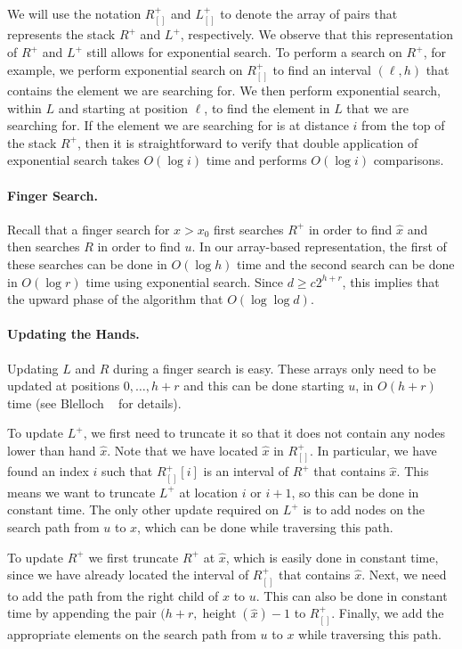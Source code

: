 \documentclass{patmorin}
\DeclareMathOperator{\hgt}{height}
\begin{document}
We will use the notation $R^+_{[]}$ and $L^+_{[]}$ to denote the array
of pairs that represents the stack $R^+$ and $L^+$, respectively.
We observe that this representation of $R^+$ and $L^+$ still allows
for exponential search.  To perform a search on $R^+$, for example, we
perform exponential search on $R^+_{[]}$ to find an interval $(\ell,
h)$ that contains the element we are searching for.  We then perform
exponential search, within $L$ and starting at position $\ell$, to find
the element in $L$ that we are searching for.  If the element we are
searching for is at distance $i$ from the top of the stack $R^+$, then
it is straightforward to verify that double application of exponential
search takes $O(\log i)$ time and performs $O(\log i)$ comparisons.

\paragraph{Finger Search.}

Recall that a finger search for $x>x_0$ first searches $R^+$ in order
to find $\hat x$ and then searches $R$ in order to find $u$.  In our
array-based representation, the first of these searches can be done in
$O(\log h)$ time and the second search can be done in $O(\log r)$
time using exponential search.  Since $d\ge c2^{h+r}$, this implies that
the upward phase of the algorithm that $O(\log\log d)$.

\paragraph{Updating the Hands.}

Updating $L$ and $R$ during a finger search is easy.  These arrays only
need to be updated at positions $0,\ldots,h+r$ and this can be done
starting $u$, in $O(h+r)$ time (see Blelloch \etal\ \cite{x} for details).

To update $L^+$, we first need to truncate it so that it does not
contain any nodes lower than hand $\hat x$.  Note that we have located
$\hat x$ in $R^+_{[]}$.  In particular, we have found an index $i$
such that $R^+_{[]}[i]$ is an interval of $R^+$ that contains $\hat x$.
This means we want to truncate $L^+$ at location $i$ or $i+1$, so this
can be done in constant time.  The only other update required on $L^+$
is to add nodes on the search path from $u$ to $x$, which can be done
while traversing this path.

To update $R^+$ we first truncate $R^+$ at $\hat x$, which is easily
done in constant time, since we have already located the interval of
$R^+_{[]}$ that contains $\hat x$. Next, we need to add the path from the
right child of $\hat x$ to $u$.  This can also be done in constant time
by appending the pair $(h+r,\hgt(\hat x)-1$ to $R^+_{[]}$.  Finally,
we add the appropriate elements on the search path from $u$ to $x$
while traversing this path.
\end{document}
